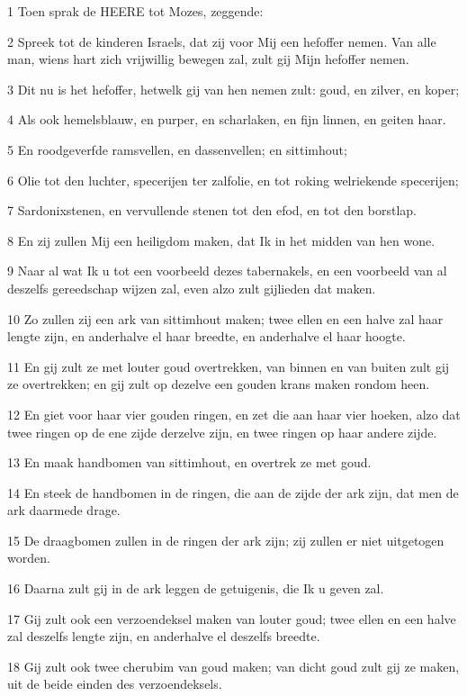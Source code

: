 \par 1 Toen sprak de HEERE tot Mozes, zeggende:
\par 2 Spreek tot de kinderen Israels, dat zij voor Mij een hefoffer nemen. Van alle man, wiens hart zich vrijwillig bewegen zal, zult gij Mijn hefoffer nemen.
\par 3 Dit nu is het hefoffer, hetwelk gij van hen nemen zult: goud, en zilver, en koper;
\par 4 Als ook hemelsblauw, en purper, en scharlaken, en fijn linnen, en geiten haar.
\par 5 En roodgeverfde ramsvellen, en dassenvellen; en sittimhout;
\par 6 Olie tot den luchter, specerijen ter zalfolie, en tot roking welriekende specerijen;
\par 7 Sardonixstenen, en vervullende stenen tot den efod, en tot den borstlap.
\par 8 En zij zullen Mij een heiligdom maken, dat Ik in het midden van hen wone.
\par 9 Naar al wat Ik u tot een voorbeeld dezes tabernakels, en een voorbeeld van al deszelfs gereedschap wijzen zal, even alzo zult gijlieden dat maken.
\par 10 Zo zullen zij een ark van sittimhout maken; twee ellen en een halve zal haar lengte zijn, en anderhalve el haar breedte, en anderhalve el haar hoogte.
\par 11 En gij zult ze met louter goud overtrekken, van binnen en van buiten zult gij ze overtrekken; en gij zult op dezelve een gouden krans maken rondom heen.
\par 12 En giet voor haar vier gouden ringen, en zet die aan haar vier hoeken, alzo dat twee ringen op de ene zijde derzelve zijn, en twee ringen op haar andere zijde.
\par 13 En maak handbomen van sittimhout, en overtrek ze met goud.
\par 14 En steek de handbomen in de ringen, die aan de zijde der ark zijn, dat men de ark daarmede drage.
\par 15 De draagbomen zullen in de ringen der ark zijn; zij zullen er niet uitgetogen worden.
\par 16 Daarna zult gij in de ark leggen de getuigenis, die Ik u geven zal.
\par 17 Gij zult ook een verzoendeksel maken van louter goud; twee ellen en een halve zal deszelfs lengte zijn, en anderhalve el deszelfs breedte.
\par 18 Gij zult ook twee cherubim van goud maken; van dicht goud zult gij ze maken, uit de beide einden des verzoendeksels.
